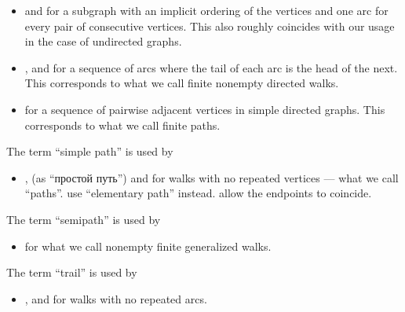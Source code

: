 \begin{remark}
\begin{thmenum}
\begin{itemize}
      \item {} and  for a subgraph with an implicit ordering of the vertices and one arc for every pair of consecutive vertices. This also roughly coincides with our usage in the case of undirected graphs.

      \item {},  and  for a sequence of arcs where the tail of each arc is the head of the next. This corresponds to what we call finite nonempty directed walks.

      \item {} for a sequence of pairwise adjacent vertices in simple directed graphs. This corresponds to what we call finite paths.
    \end{itemize}

     The term \enquote{simple path} is used by
    \begin{itemize}
      \item {},  (as \enquote{простой путь}) and  for walks with no repeated vertices --- what we call \enquote{paths}.  use \enquote{elementary path} instead.  allow the endpoints to coincide.
    \end{itemize}

     The term \enquote{semipath} is used by
    \begin{itemize}
      \item {} for what we call nonempty finite generalized walks.
    \end{itemize}

     The term \enquote{trail} is used by
    \begin{itemize}
      \item {},  and  for walks with no repeated arcs.
    \end{itemize}


\end{thmenum}
\end{remark}
